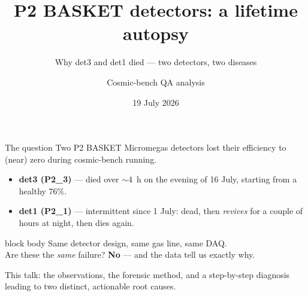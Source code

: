 \documentclass[10pt,aspectratio=169]{beamer}
\title{P2 BASKET detectors: a lifetime autopsy}
\subtitle{Why det3 and det1 died --- two detectors, two diseases}
\author{Cosmic-bench QA analysis}
\institute{P2 BASKET / Saclay}
\date{19 July 2026}
\newcommand{\keybox}[1]{%
  \begin{center}\begin{beamercolorbox}[wd=0.94\textwidth,sep=6pt,rounded=true,shadow=true]{block body}%
  \centering #1
  \end{beamercolorbox}\end{center}}
\newcommand{\bv}[1]{{\color{bad}\textbf{#1}}}
\begin{document}
\maketitle

\begin{frame}{The question}
Two P2 BASKET Micromegas detectors lost their efficiency to (near) zero during
cosmic-bench running.
\begin{itemize}
  \item \textbf{det3 (P2\_3)} --- died over $\sim$4~h on the evening of 16 July,
        starting from a healthy 76\%.
  \item \textbf{det1 (P2\_1)} --- intermittent since 1 July: dead, then
        \emph{revives} for a couple of hours at night, then dies again.
\end{itemize}
\vfill
\keybox{\large Same detector design, same gas line, same DAQ. \\[2pt]
Are these the \emph{same} failure? \bv{No} --- and the data tell us exactly why.}
\vfill
\footnotesize This talk: the observations, the forensic method, and a
step-by-step diagnosis leading to two distinct, actionable root causes.
\end{frame}
\end{document}
